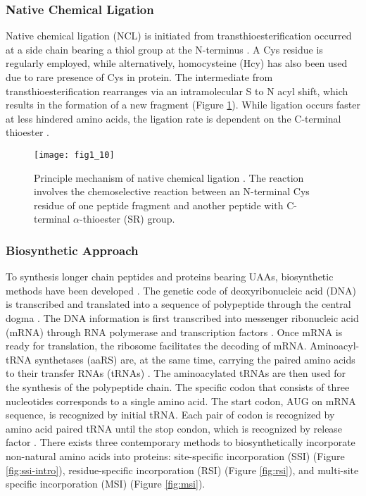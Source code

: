 \begin{refsection}
\subsubsection{Native Chemical Ligation}

Native chemical ligation (NCL) is initiated from transthioesterification
occurred at a side chain bearing a thiol group at the N-terminus
\cite{Dawson1994}. A Cys residue is regularly employed, while alternatively,
homocysteine (Hcy) has also been used due to rare presence of Cys in protein.
The intermediate from transthioesterification rearranges via an intramolecular
S to N acyl shift, which results in the formation of a new fragment (Figure
\ref{fig:ncl-intro}). While ligation occurs faster at less hindered amino
acids, the ligation rate is dependent on the C-terminal thioester
\cite{Thapa2014}. 
\begin{figure}[htbp] \centering \texttt{[image: fig1\_10]}
    \caption[Princilple mechanism of native chemical ligation. The reaction
    involves the chemoselective reaction between an N-terminal Cys residue of
one peptide fragment and another peptide with C-terminal $\alpha$-thioester
(SR) group.]{Principle mechanism of native chemical ligation \cite{Theato2013}.
The reaction involves the chemoselective reaction between an N-terminal Cys
residue of one peptide fragment and another peptide with C-terminal
$\alpha$-thioester (SR) group.} 
\label{fig:ncl-intro} 
\end{figure}

\subsubsection{Biosynthetic Approach}

To synthesis longer chain peptides and proteins bearing UAAs, biosynthetic
methods have been developed
\cite{Voloshchuk2007b,Yoo2007,Johnson2010,Link2003,Voloshchuk2010,Montclare2006b}.
The genetic code of deoxyribonucleic acid (DNA) is transcribed and translated
into a sequence of polypeptide through the central dogma \cite{CRICK1970}. The
DNA information is first transcribed into messenger ribonucleic acid (mRNA)
through RNA polymerase and transcription factors \cite{Pukkila2001}. Once mRNA
is ready for translation, the ribosome facilitates the decoding of mRNA.
Aminoacyl-tRNA synthetases (aaRS) are, at the same time, carrying the paired
amino acids to their transfer RNAs (tRNAs) \cite{Pukkila2001}. The
aminoacylated tRNAs are then used for the synthesis of the polypeptide chain.
The specific codon that consists of three nucleotides corresponds to a single
amino acid. The start codon, AUG on mRNA sequence, is recognized by initial
tRNA.  Each pair of codon is recognized by amino acid paired tRNA
\cite{Sadava2006} until the stop condon, which is recognized by release factor
\cite{Pukkila2001}. There exists three contemporary methods to biosynthetically
incorporate non-natural amino acids into proteins: site-specific incorporation
(SSI) (Figure \ref{fig:ssi-intro}), residue-specific incorporation (RSI)
(Figure \ref{fig:rsi}), and multi-site specific incorporation (MSI) (Figure
\ref{fig:msi}). 


\end{refsection}
